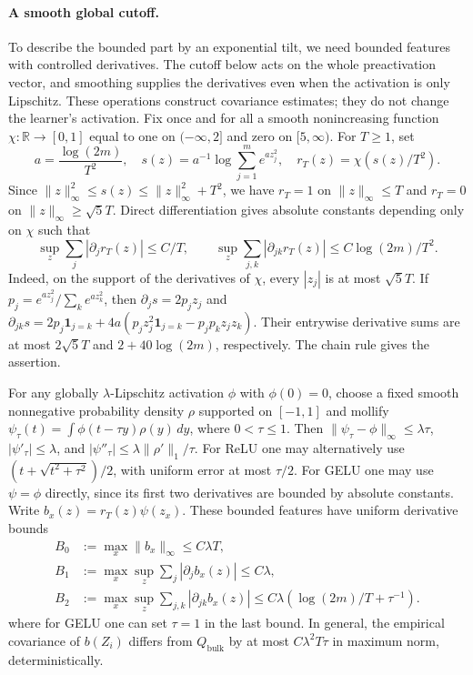 \paragraph{A smooth global cutoff.}
To describe the bounded part by an exponential tilt, we need bounded
features with controlled derivatives. The cutoff below acts on the whole
preactivation vector, and smoothing supplies the derivatives even when
the activation is only Lipschitz. These operations construct covariance
estimates; they do not change the learner's activation.
Fix once and for all a smooth nonincreasing function
$\chi:\mathbb R\to[0,1]$ equal to one on $(-\infty,2]$ and zero on
$[5,\infty)$. For $T\geq1$, set
\[
 a=\frac{\log(2m)}{T^2},\quad
 s(z)=a^{-1}\log\sum_{j=1}^m e^{az_j^2},\quad
 r_T(z)=\chi(s(z)/T^2).
\]
Since $\|z\|_\infty^2\leq s(z)\leq\|z\|_\infty^2+T^2$,
we have $r_T=1$ on $\|z\|_\infty\leq T$ and $r_T=0$ on
$\|z\|_\infty\geq\sqrt5T$. Direct differentiation gives absolute constants
depending only on $\chi$ such that
\[
 \sup_z\sum_j|\partial_jr_T(z)|\leq C/T,
 \qquad
 \sup_z\sum_{j,k}|\partial_{jk}r_T(z)|
       \leq C\log(2m)/T^2.
\]
Indeed, on the support of the derivatives of $\chi$, every $|z_j|$ is at
most $\sqrt5T$. If $p_j=e^{az_j^2}/\sum_ke^{az_k^2}$, then
$\partial_js=2p_jz_j$ and
$\partial_{jk}s=2p_j\mathbf1_{j=k}
 +4a(p_jz_j^2\mathbf1_{j=k}-p_jp_kz_jz_k)$.
Their entrywise derivative sums are at most $2\sqrt5T$ and
$2+40\log(2m)$, respectively. The chain rule gives the assertion.

For any globally $\lambda$-Lipschitz activation $\phi$ with $\phi(0)=0$,
choose a fixed smooth nonnegative probability density $\rho$ supported
on $[-1,1]$ and mollify
$\psi_\tau(t)=\int\phi(t-\tau y)\rho(y)\,dy$, where $0<\tau\leq1$.
Then $\|\psi_\tau-\phi\|_\infty\leq\lambda\tau$,
$|\psi'_\tau|\leq\lambda$, and
$|\psi''_\tau|\leq\lambda\|\rho'\|_1/\tau$.
For ReLU one may alternatively use
$(t+\sqrt{t^2+\tau^2})/2$, with uniform error at most $\tau/2$.
For GELU one may use $\psi=\phi$ directly, since its first two
derivatives are bounded by absolute constants. Write
$b_x(z)=r_T(z)\psi(z_x)$.
These bounded features have uniform derivative bounds
\begin{align*}
 B_0&:=\max_x\|b_x\|_\infty\leq C\lambda T,\\
 B_1&:=\max_x\sup_z\sum_j|\partial_jb_x(z)|\leq C\lambda,\\
 B_2&:=\max_x\sup_z\sum_{j,k}|\partial_{jk}b_x(z)|
       \leq C\lambda(\log(2m)/T+\tau^{-1}).
\end{align*}
where for GELU one can set $\tau=1$ in the last bound. In general,
the empirical covariance of $b(Z_i)$ differs from $Q_{\mathrm{bulk}}$
by at most $C\lambda^2 T\tau$ in maximum norm, deterministically.


